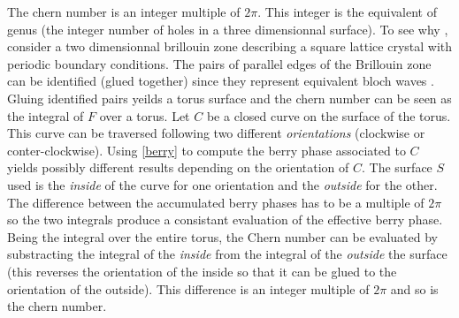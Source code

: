 The chern number is an integer multiple of $2\pi$. This integer is the equivalent of genus (the integer number of holes in a three dimensionnal surface). To see why \cite{avron_topological_2003}, consider a two dimensionnal brillouin zone describing a square lattice crystal with periodic boundary conditions. The pairs of parallel edges of the Brillouin zone can be identified (glued together) since they represent equivalent bloch waves . Gluing identified pairs yeilds a torus surface \cite{kane_topological_2013} and the chern number can be seen as the integral of $F$ over a torus. Let $C$ be a closed curve on the surface of the torus. This curve can be traversed following two different \textit{orientations} (clockwise or conter-clockwise). Using \eqref{berry} to compute the berry phase associated to $C$ yields possibly different results depending on the orientation of $C$. The surface $S$ used is the \textit{inside} of the curve for one orientation and the \textit{outside} for the other. The difference between the accumulated berry phases has to be a multiple of $2\pi$ so the two integrals produce a consistant evaluation of the effective berry phase. Being the integral over the entire torus, the Chern number can be evaluated by substracting the integral of the \textit{inside} from the integral of the \textit{outside} the surface (this reverses the orientation of the inside so that it can be glued to the orientation of the outside). This difference is an integer multiple of $2\pi$ and so is the chern number.


